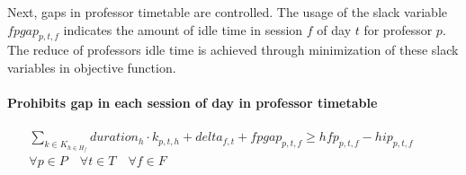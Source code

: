 Next, gaps in professor timetable are controlled. The usage of the slack variable $fpgap_{p,t,f}$ indicates the amount of idle time in session $f$ of day $t$ for professor $p$. The reduce of professors idle time is achieved through minimization of these slack variables in objective function.

\paragraph{Prohibits gap in each session of day in professor timetable}
\begin{eqnarray}
\sum\limits_{k \in K_{h \in H_{f}}} duration_{h} \cdot k_{p,t,h} + delta_{f,t} + fpgap_{p,t,f} \geq hfp_{p,t,f} - hip_{p,t,f} \nonumber \qquad
\\
\forall p \in P \quad
\forall t \in T \quad
\forall f \in F \quad \nonumber
\end{eqnarray}



